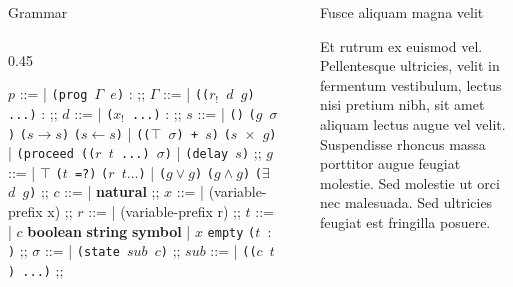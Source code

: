 \documentclass[final]{beamer}
\newlength{\sepwidth}
\newlength{\colwidth}
\newcommand{\separatorcolumn}{\begin{column}{\sepwidth}\end{column}}
\begin{document}
\begin{frame}[t]
\begin{columns}[t]
\begin{column}{\colwidth}
  \begin{block}{Grammar}
    \begin{column}{0.45\colwidth}
      \begin{bnf}
$p$ ::=
| \texttt{(prog $\Gamma$ $e$)} :
;;
$\Gamma$ ::=
| \texttt{(($r_!$ $d$ $g$) ...)} :
;;
$d$ ::=
| \texttt{($x_!$ ...)} :
;;
$s$ ::=
| \texttt{()} 	\texttt{($g$ $\sigma$)} \texttt{($s \rightarrow s$)} \texttt{($s \leftarrow s$)} 
| \texttt{(($\top$ $\sigma$) + $s$)} \texttt{($s$ $\times$ $g$)} 
| \texttt{(proceed (($r$ $t$ ...) $\sigma$)} 
| \texttt{(delay $s$)} 
;;
$g$ ::= 
| $\top$ \texttt{($t$ =?)} \texttt{($r$ $t ...$)}
| \texttt{($g \vee g$)} \texttt{($g \wedge g$)} \texttt{($\exists$ $d$ $g$)}
;;
$c$ ::=
| \textbf{natural}
;;
$x$ ::=
| (variable-prefix x\text{$\colon$})
;;
$r$ ::=
| (variable-prefix r\text{$\colon$})
;;
$t$ ::=
| $c$ \textbf{boolean} \textbf{string} \textbf{symbol}
| $x$ \texttt{empty} \texttt{($t$ $\colon$)}
;;
$\sigma$  ::=
| \texttt{(state $sub$ $c$)}
;;
$sub$ ::=
| \texttt{(($c$ $t$) ...)}
;;
      \end{bnf}
    \end{column}



  \end{block}

\end{column}

\separatorcolumn

\begin{column}{\colwidth}

  

  \begin{block}{Fusce aliquam magna velit}

    Et rutrum ex euismod vel. Pellentesque ultricies, velit in fermentum
    vestibulum, lectus nisi pretium nibh, sit amet aliquam lectus augue vel
    velit. Suspendisse rhoncus massa porttitor augue feugiat molestie. Sed
    molestie ut orci nec malesuada. Sed ultricies feugiat est fringilla
    posuere.


\end{block}
\end{column}
\end{columns}
\end{frame}
\end{document}
